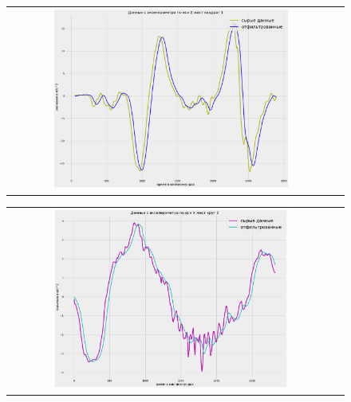\begin{figure}[H]
    \begin{center}
        \begin{tabular}{cc}
            \includegraphics[width=0.75\textwidth]{farim/sqzres} & 
        \end{tabular}
    \end{center}
\end{figure}

\begin{figure}[H]
    \begin{center}
        \begin{tabular}{cc}
            \includegraphics[width=0.75\textwidth]{farim/cirxres.png} & 
        \end{tabular}
    \end{center}
\end{figure}

